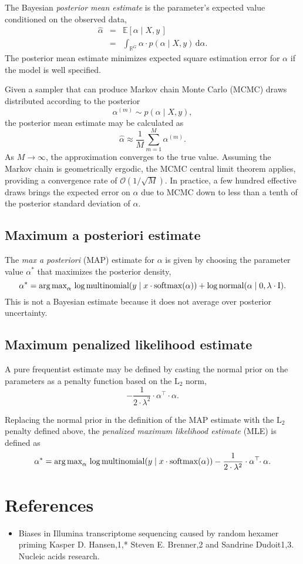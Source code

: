 \documentclass[11pt]{article}
\begin{document}
The Bayesian \emph{posterior mean estimate} is the parameter's
expected value conditioned on the observed data,
\begin{eqnarray*}
  \widehat{\alpha}
  & = & \mathbb{E}\!\left[\alpha \mid X, y \, \right]
  \\[6pt]
  & = & \int_{\mathbb{R}^G} \alpha \cdot p(\alpha \mid X, y) \, \textrm{d}\alpha.
\end{eqnarray*}
The posterior mean estimate minimizes expected square estimation error
for $\alpha$ if the model is well specified.

Given a sampler that can produce Markov chain Monte Carlo (MCMC) draws
distributed according to the posterior
\[
  \alpha^{(m)} \sim p(\alpha \mid X, y),
\]
the posterior mean estimate may be calculated as
\[
  \widehat{\alpha} \approx \frac{1}{M} \sum_{m = 1}^M \alpha^{(m)}.
\]
As $M \rightarrow \infty$, the approximation converges to the true
value.  Assuming the Markov chain is geometrically ergodic, the MCMC
central limit theorem applies, providing a convergence rate of
$\mathcal{O}\left(1 / \sqrt{M}\right)$.  In practice, a few hundred
effective draws brings the expected error on $\widehat{\alpha}$ due to
MCMC down to less than a tenth of the posterior standard deviation of
$\alpha$.

\subsection{Maximum a posteriori estimate}

The \emph{max a posteriori} (MAP) estimate for $\alpha$ is given by
choosing the parameter value $\alpha^*$ that maximizes the posterior
density,
\[
  \alpha^* = \textrm{arg\,max}_{\alpha} \,
  \log \textrm{multinomial}(y \mid x \cdot \textrm{softmax}(\alpha))
  + \log \textrm{normal}(\alpha \mid 0, \lambda \cdot \textrm{I}).
\]
This is not a Bayesian estimate because it does not average over
posterior uncertainty.


\subsection{Maximum penalized likelihood estimate}

A pure frequentist estimate may be defined by casting the normal prior
on the parameters as a penalty function based on the $\textrm{L}_2$
norm,
\[
  -\frac{1}{2 \cdot \lambda^2} \cdot \alpha^{\top}\!\! \cdot \alpha.
\]

Replacing the normal prior in the definition of the MAP estimate with
the $\textrm{L}_2$ penalty defined above, the
\emph{penalized maximum likelihood estimate} (MLE) is defined as
\[
  \alpha^* = \textrm{arg\,max}_{\alpha} \,
  \log \textrm{multinomial}(y \mid x \cdot \textrm{softmax}(\alpha))
  - \frac{1}{2 \cdot \lambda^2} \cdot \alpha^{\top}\!\! \cdot \alpha.
\]


\section*{References}

\begin{itemize}
\item Biases in Illumina transcriptome sequencing caused by random
  hexamer priming Kasper D. Hansen,1,* Steven E. Brenner,2 and
  Sandrine Dudoit1,3.  Nucleic acids research.
\end{itemize}
\end{document}
